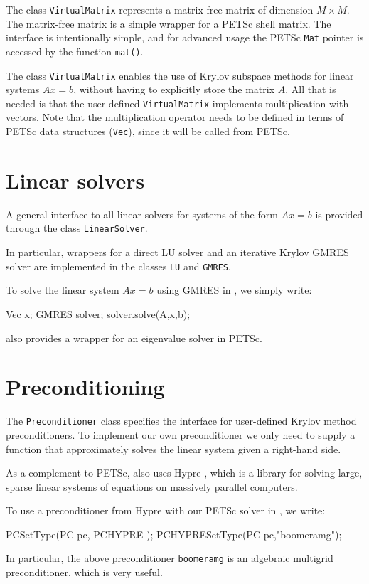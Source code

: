 The \dolfin{} class \texttt{VirtualMatrix} represents a matrix-free 
matrix of dimension $M\times M$. 
The matrix-free matrix is a simple wrapper for a PETSc shell matrix. 
The interface is intentionally simple, and for advanced usage the 
PETSc \texttt{Mat} pointer is accessed by the function \texttt{mat()}.  

The class \texttt{VirtualMatrix} enables the use of Krylov subspace
methods for linear systems $Ax = b$, without having to explicitly
store the matrix $A$. All that is needed is that the user-defined
\texttt{VirtualMatrix} implements multiplication with vectors. 
Note that the multiplication operator needs to be defined in terms of
PETSc data structures (\texttt{Vec}), since it will be called from PETSc.

\section{Linear solvers}

A general interface to all linear solvers for systems of the form 
$Ax=b$ is provided through the class \texttt{LinearSolver}. 

In particular, wrappers for a direct LU solver and an iterative 
Krylov GMRES solver are implemented in the classes \texttt{LU} and \texttt{GMRES}. 

To solve the linear system $Ax=b$ using GMRES in \dolfin{}, we simply write:  
%
\begin{code} 
Vec x;
GMRES solver; 
solver.solve(A,x,b);
\end{code} 
%
\dolfin{} also provides a wrapper for an eigenvalue solver in PETSc. 

\section{Preconditioning}

The \texttt{Preconditioner} class specifies the interface for user-defined 
Krylov method preconditioners. To implement our own preconditioner we only 
need to supply a function that approximately solves the linear system given 
a right-hand side.

As a complement to PETSc, \dolfin{} also uses Hypre \cite{www:hypre}, which is a 
library for solving large, sparse linear systems of equations on 
massively parallel computers. 

To use a preconditioner from Hypre with our PETSc solver in \dolfin{}, we write:  
%
\begin{code}
PCSetType(PC pc, PCHYPRE );
PCHYPRESetType(PC pc,"boomeramg");
\end{code}

In particular, the above preconditioner \texttt{boomeramg} is an algebraic multigrid 
preconditioner, which is very useful. 


